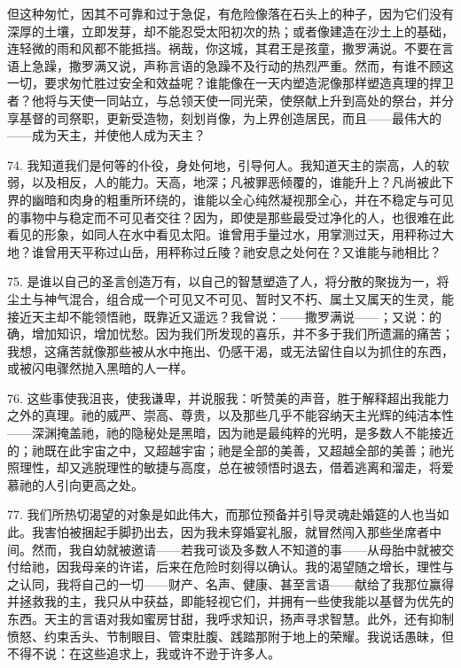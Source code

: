 但这种匆忙，因其不可靠和过于急促，有危险像落在石头上的种子，因为它们没有深厚的土壤，立即发芽，却不能忍受太阳初次的热；或者像建造在沙土上的基础，连轻微的雨和风都不能抵挡。祸哉，你这城，其君王是孩童，撒罗满说。不要在言语上急躁，撒罗满又说，声称言语的急躁不及行动的热烈严重。然而，有谁不顾这一切，要求匆忙胜过安全和效益呢？谁能像在一天内塑造泥像那样塑造真理的捍卫者？他将与天使一同站立，与总领天使一同光荣，使祭献上升到高处的祭台，并分享基督的司祭职，更新受造物，刻划肖像，为上界创造居民，而且——最伟大的——成为天主，并使他人成为天主？\par

74. 我知道我们是何等的仆役，身处何地，引导何人。我知道天主的崇高，人的软弱，以及相反，人的能力。天高，地深；凡被罪恶倾覆的，谁能升上？凡尚被此下界的幽暗和肉身的粗重所环绕的，谁能以全心纯然凝视那全心，并在不稳定与可见的事物中与稳定而不可见者交往？因为，即使是那些最受过净化的人，也很难在此看见的形象，如同人在水中看见太阳。谁曾用手量过水，用掌测过天，用秤称过大地？谁曾用天平称过山岳，用秤称过丘陵？祂安息之处何在？又谁能与祂相比？\par

75. 是谁以自己的圣言创造万有，以自己的智慧塑造了人，将分散的聚拢为一，将尘土与神气混合，组合成一个可见又不可见、暂时又不朽、属土又属天的生灵，能接近天主却不能领悟祂，既靠近又遥远？我曾说：——撒罗满说——；又说：的确，增加知识，增加忧愁。因为我们所发现的喜乐，并不多于我们所遗漏的痛苦；我想，这痛苦就像那些被从水中拖出、仍感干渴，或无法留住自以为抓住的东西，或被闪电骤然抛入黑暗的人一样。\par

76. 这些事使我沮丧，使我谦卑，并说服我：听赞美的声音，胜于解释超出我能力之外的真理。祂的威严、崇高、尊贵，以及那些几乎不能容纳天主光辉的纯洁本性——深渊掩盖祂，祂的隐秘处是黑暗，因为祂是最纯粹的光明，是多数人不能接近的；祂既在此宇宙之中，又超越宇宙；祂是全部的美善，又超越全部的美善；祂光照理性，却又逃脱理性的敏捷与高度，总在被领悟时退去，借着逃离和溜走，将爱慕祂的人引向更高之处。\par

77. 我们所热切渴望的对象是如此伟大，而那位预备并引导灵魂赴婚筵的人也当如此。我害怕被捆起手脚扔出去，因为我未穿婚宴礼服，就冒然闯入那些坐席者中间。然而，我自幼就被邀请——若我可谈及多数人不知道的事——从母胎中就被交付给祂，因我母亲的许诺，后来在危险时刻得以确认。我的渴望随之增长，理性与之认同，我将自己的一切——财产、名声、健康、甚至言语——献给了我那位赢得并拯救我的主，我只从中获益，即能轻视它们，并拥有一些使我能以基督为优先的东西。天主的言语对我如蜜房甘甜，我呼求知识，扬声寻求智慧。此外，还有抑制愤怒、约束舌头、节制眼目、管束肚腹、践踏那附于地上的荣耀。我说话愚昧，但不得不说：在这些追求上，我或许不逊于许多人。\par


